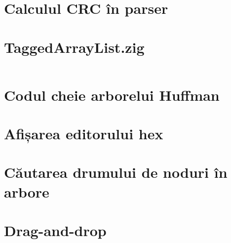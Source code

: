 \documentclass[a4paper,12pt]{report}
\begin{document}
\section{Calculul CRC în parser}\label{appendix:crc_sequence_defer_example} %

\section{TaggedArrayList.zig}\label{appendix:main__TaggedArrayList} %
\inputminted{zig}{../src/TaggedArrayList.zig}

\section{Codul cheie arborelui Huffman}\label{appendix:huffman_tree}%

\section{Afișarea editorului hex}\label{appendix:draw_hex_grid}%

\section{Căutarea drumului de noduri în arbore}\label{appendix:node_path_search_impl}%

\section{Drag-and-drop}\label{appendix:drag_and_drop}%


\end{document}
